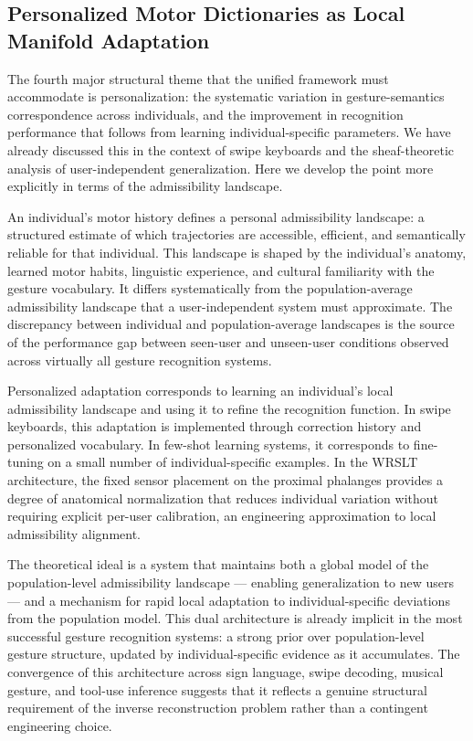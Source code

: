 \documentclass[11pt, a4paper]{article}
\theoremstyle{definition}
\begin{document}
\subsection{Personalized Motor Dictionaries as Local Manifold Adaptation}

The fourth major structural theme that the unified framework must accommodate is personalization: the systematic variation in gesture-semantics correspondence across individuals, and the improvement in recognition performance that follows from learning individual-specific parameters. We have already discussed this in the context of swipe keyboards and the sheaf-theoretic analysis of user-independent generalization. Here we develop the point more explicitly in terms of the admissibility landscape.

An individual's motor history defines a personal admissibility landscape: a structured estimate of which trajectories are accessible, efficient, and semantically reliable for that individual. This landscape is shaped by the individual's anatomy, learned motor habits, linguistic experience, and cultural familiarity with the gesture vocabulary. It differs systematically from the population-average admissibility landscape that a user-independent system must approximate. The discrepancy between individual and population-average landscapes is the source of the performance gap between seen-user and unseen-user conditions observed across virtually all gesture recognition systems.

Personalized adaptation corresponds to learning an individual's local admissibility landscape and using it to refine the recognition function. In swipe keyboards, this adaptation is implemented through correction history and personalized vocabulary. In few-shot learning systems, it corresponds to fine-tuning on a small number of individual-specific examples. In the WRSLT architecture, the fixed sensor placement on the proximal phalanges provides a degree of anatomical normalization that reduces individual variation without requiring explicit per-user calibration, an engineering approximation to local admissibility alignment.

The theoretical ideal is a system that maintains both a global model of the population-level admissibility landscape --- enabling generalization to new users --- and a mechanism for rapid local adaptation to individual-specific deviations from the population model. This dual architecture is already implicit in the most successful gesture recognition systems: a strong prior over population-level gesture structure, updated by individual-specific evidence as it accumulates. The convergence of this architecture across sign language, swipe decoding, musical gesture, and tool-use inference suggests that it reflects a genuine structural requirement of the inverse reconstruction problem rather than a contingent engineering choice.
\end{document}
